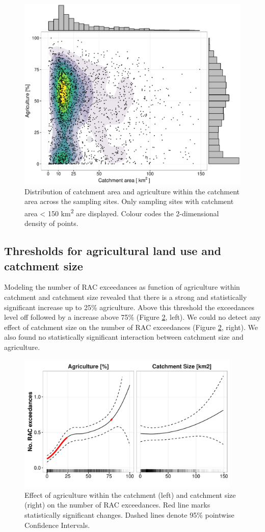 \documentclass[journal=esthag,manuscript=article]{achemso}
\begin{document}
\begin{figure}[ht]
  \includegraphics[width=.8\textwidth]{figure3.pdf}
  \caption{Distribution of catchment area and agriculture within the catchment area across the sampling sites.
  Only sampling sites with catchment area < 150 km\textsuperscript{2} are displayed. 
  Colour codes the 2-dimensional density of points.}
  \label{fig:fig3}
\end{figure}


\subsection{Thresholds for agricultural land use and catchment size}
Modeling the number of RAC exceedances as function of agriculture within catchment and catchment size revealed that there is a strong and statistically significant increase up to 25\% agriculture.
Above this threshold the exceedances level off followed by a increase above 75\% (Figure \ref{fig:fig4}, left).
We could no detect any effect of catchment size on the number of RAC exceedances (Figure \ref{fig:fig4}, right).
We also found no statistically significant interaction between catchment size and agriculture.

\begin{figure}[ht]
  \includegraphics[width=0.95\textwidth]{figure4.pdf}
  \caption{Effect of agriculture within the catchment (left) and catchment size (right) on the number of RAC exceedances. Red line marks statistically significant changes. Dashed lines denote 95\% pointwise Confidence Intervals.
  }
  \label{fig:fig4}
\end{figure}
\end{document}
